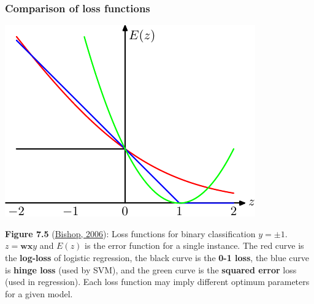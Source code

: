 \documentclass[ignorenonframetext,plain]{beamer}
\DeclareMathOperator*{\argmin}{argmin}
\renewcommand{\vec}{\mathbf}
\begin{document}
\begin{frame}\frametitle{Comparison of loss functions}
\begin{center}
\includegraphics[height=.5\textheight]{images/bishop-fig-7-5.pdf}
\end{center}\footnotesize
{\bf Figure 7.5}
(\href{http://research.microsoft.com/en-us/um/people/cmbishop/prml}
{Bishop, 2006}): Loss functions for binary classification $y=\pm 1$.
$z=\mathbf{w}\mathbf{x}y$ and $E(z)$ is the error function for a
single instance.  The red curve is the {\bf log-loss} of logistic
regression, the black curve is the {\bf 0-1 loss}, the blue curve is
{\bf hinge loss} (used by SVM), and the green curve is the {\bf
  squared error} loss (used in regression).  Each loss function may
imply different optimum parameters for a given model.
\end{frame}

\end{document}
